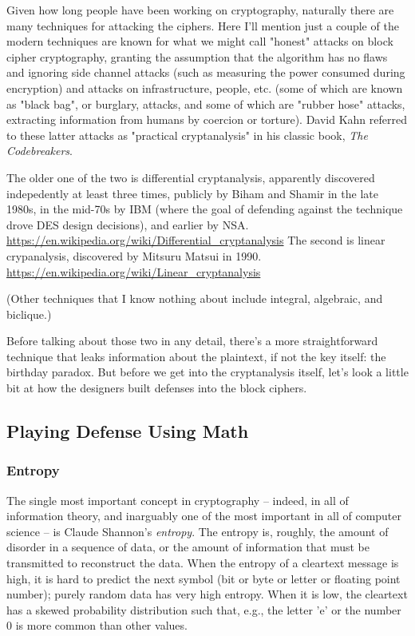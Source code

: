 \documentclass[%
 aip,
 jmp,%
 amsmath,amssymb,
 reprint,%
]{revtex4-1}
\begin{document}
Given how long people have been working on cryptography, naturally
there are many techniques for attacking the ciphers.  Here I'll
mention just a couple of the modern techniques are known for what we
might call "honest" attacks on block cipher cryptography, granting the
assumption that the algorithm has no flaws and ignoring side channel
attacks (such as measuring the power consumed during encryption) and
attacks on infrastructure, people, etc. (some of which are known as
"black bag", or burglary, attacks, and some of which are "rubber hose"
attacks, extracting information from humans by coercion or torture).
David Kahn referred to these latter attacks as "practical
cryptanalysis" in his classic book, \emph{The Codebreakers}.

The older one of the two is differential cryptanalysis, apparently
discovered indepedently at least three times, publicly by Biham and
Shamir in the late 1980s, in the mid-70s by IBM (where the goal of
defending against the technique drove DES design decisions), and
earlier by NSA.
\url{https://en.wikipedia.org/wiki/Differential_cryptanalysis}
The second is linear crypanalysis, discovered by Mitsuru Matsui in
1990.
\url{https://en.wikipedia.org/wiki/Linear_cryptanalysis}

(Other techniques that I know nothing about include integral,
algebraic, and biclique.)

Before talking about those two in any detail, there's a more
straightforward technique that leaks information about the plaintext,
if not the key itself: the birthday paradox.  But before we get into
the cryptanalysis itself, let's look a little bit at how the designers
built defenses into the block ciphers.

\subsection{Playing Defense Using Math}

\subsubsection{Entropy}

The single most important concept in cryptography -- indeed, in all of
information theory, and inarguably one of the most important in all of
computer science -- is Claude Shannon's \emph{entropy}.  The entropy is,
roughly, the amount of disorder in a sequence of data, or the amount
of information that must be transmitted to reconstruct the data.  When
the entropy of a cleartext message is high, it is hard to predict the
next symbol (bit or byte or letter or floating point number); purely
random data has very high entropy.  When it is low, the cleartext has
a skewed probability distribution such that, e.g., the letter 'e' or
the number 0 is more common than other values.
\end{document}

